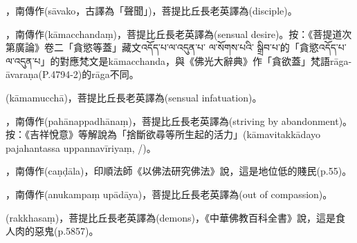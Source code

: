 \startitemgroup[noteitems]
\item{}，南傳作(sāvako，古譯為「聲聞」)，菩提比丘長老英譯為(disciple)。
\stopitemgroup

\startitemgroup[noteitems]
\item{}，南傳作(kāmacchandaṃ)，菩提比丘長老英譯為(sensual desire)。按：《菩提道次第廣論》卷二「貪慾等蓋」藏文འདོད་པ་ལ་འདུན་པ་ ལ་སོགས་པའི་ སྒྲིབ་པ་的「貪慾འདོད་པ་ལ་འདུན་པ」的對應梵文是kāmacchanda，與《佛光大辭典》作「貪欲蓋」梵語rāga-āvaraṇa(P.4794-2)的rāga不同。
\item{}(kāmamucchā)，菩提比丘長老英譯為(sensual infatuation)。
\stopitemgroup

\startitemgroup[noteitems]
\item{}，南傳作(pahānappadhānaṃ)，菩提比丘長老英譯為(striving by abandonment)。按：《吉祥悅意》等解說為「捨斷欲尋等所生起的活力」(kāmavitakkādayo pajahantassa uppannavīriyaṃ, /)。
\stopitemgroup

\startitemgroup[noteitems]
\item{}，南傳作(caṇḍāla)，印順法師《以佛法研究佛法》說，這是地位低的賤民(p.55)。
\stopitemgroup

\startitemgroup[noteitems]
\item{}，南傳作(anukampaṃ upādāya)，菩提比丘長老英譯為(out of compassion)。
\stopitemgroup

\startitemgroup[noteitems]
\item{}(rakkhasaṃ)，菩提比丘長老英譯為(demons)，《中華佛教百科全書》說，這是食人肉的惡鬼(p.5857)。
\stopitemgroup

